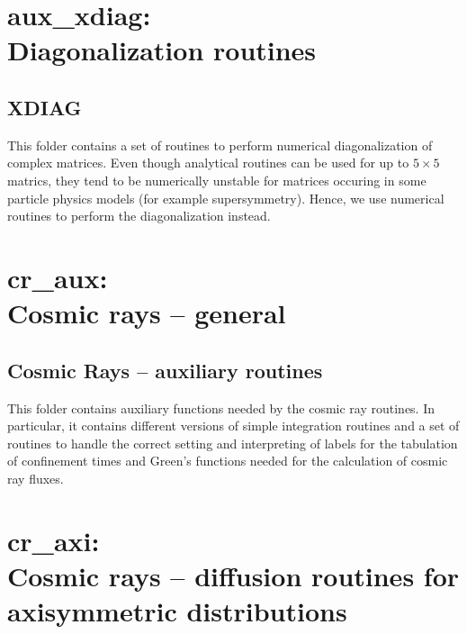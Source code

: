 \documentclass[a4paper,10pt,oneside]{book}
\newcommand{\codeb}[1]{\ftb{#1}}
\newcommand{\ftb}[1]{{\bfseries \sffamily #1}}
\begin{document}
\chapter[aux\_xdiag: Diagonalization routines]{\codeb{aux\_xdiag}:\\ Diagonalization routines}
\label{ch:src/aux_xdiag}

\section{XDIAG}

This folder contains a set of routines to perform numerical
diagonalization of complex matrices. Even though analytical routines can be
used for up to $5 \times 5$ matrics, they tend to be numerically unstable for
matrices occuring in some particle physics models (for example supersymmetry).
Hence, we use numerical routines to perform the diagonalization instead.

\chapter[cr\_aux: Cosmic rays -- general]{\codeb{cr\_aux}:\\ Cosmic rays -- general}
\label{ch:src/cr_aux}

\section{Cosmic Rays -- auxiliary routines}

This folder contains auxiliary functions needed by the cosmic ray routines. In particular,
it contains different versions of simple integration routines and a set of routines
to handle the correct setting and interpreting of labels for the tabulation of confinement times
and Green's functions needed for the calculation of cosmic ray fluxes.

\chapter[cr\_axi: Cosmic rays -- diffusion routines for axisymmetric distributions]{\codeb{cr\_axi}:\\ Cosmic rays -- diffusion routines for axisymmetric distributions}
\label{ch:src/cr_axi}

\end{document}
